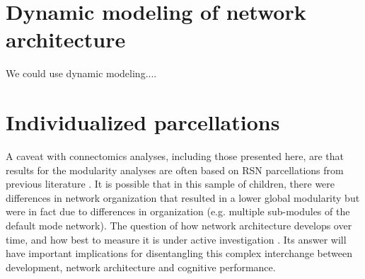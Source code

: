 \section{Dynamic modeling of network architecture}

We could use dynamic modeling....

\section{Individualized parcellations}

A caveat with connectomics analyses, including those presented here, are that results for the modularity analyses are often based on RSN parcellations from previous literature \citep{Power2011}. It is possible that in this sample of children, there were differences in network organization that resulted in a lower global modularity but were in fact due to differences in organization (e.g. multiple sub-modules of the default mode network). The question of how network architecture develops over time, and how best to measure it is under active investigation \citep{Cao2016}. Its answer will have important implications for disentangling this complex interchange between development, network architecture and cognitive performance.

